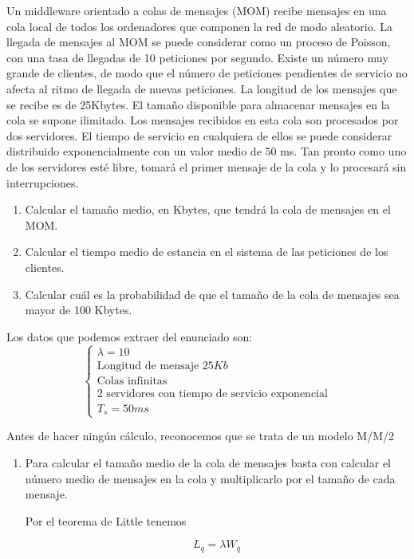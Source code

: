 \begin{problem}[11]
Un middleware orientado a colas de mensajes (MOM) recibe mensajes en una cola local de todos los ordenadores que componen la red de modo aleatorio. La llegada de mensajes al MOM se puede considerar como un proceso de Poisson, con una tasa de llegadas de 10 peticiones por segundo. Existe un número muy grande de clientes, de modo que el número de peticiones pendientes de servicio no afecta al ritmo de llegada de nuevas peticiones. La longitud de los mensajes que se recibe es de 25Kbytes. El tamaño disponible para almacenar mensajes en la cola se supone ilimitado. Los mensajes recibidos en esta cola son procesados por dos servidores. El tiempo de servicio en cualquiera de ellos se puede considerar distribuido exponencialmente con un valor medio de 50 ms. Tan pronto como uno de los servidores esté libre, tomará el primer mensaje de la cola y lo procesará sin interrupciones.
\begin{enumerate}
\item Calcular el tamaño medio, en Kbytes, que tendrá la cola de mensajes en el MOM.
\item Calcular el tiempo medio de estancia en el sistema de las peticiones de los clientes.
\item Calcular cuál es la probabilidad de que el tamaño de la cola de mensajes sea mayor de 100 Kbytes.
\end{enumerate}


\solution

\yoP


Los datos que podemos extraer del enunciado son:
\[\left\{
\begin{array}{l}
λ = 10 \\
\text{Longitud de mensaje } 25Kb \\
\text{Colas infinitas} \\
\text{2 servidores con tiempo de servicio exponencial} \\
T_s = 50ms
\end{array}
\right.\]

Antes de hacer ningún cálculo, reconocemos que se trata de un modelo M/M/2
\begin{enumerate}
\item
Para calcular el tamaño medio de la cola de mensajes basta con calcular el número medio de mensajes en la cola y multiplicarlo por el tamaño de cada mensaje.

Por el teorema de Little tenemos

\[L_q = λ W_q\]


\end{enumerate}
\end{problem}
